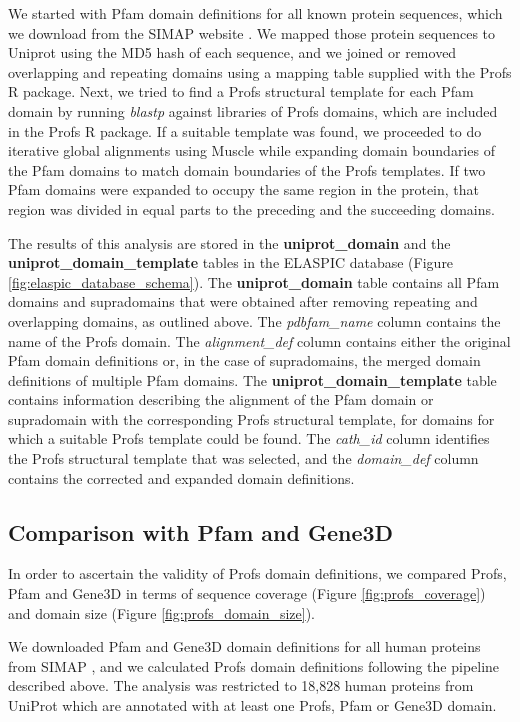 We started with Pfam domain definitions for all known protein sequences, which we download from the SIMAP website \cite{rattei_simapcomprehensive_2010}. We mapped those protein sequences to Uniprot using the MD5 hash of each sequence, and we joined or removed overlapping and repeating domains using a mapping table supplied with the Profs R package. Next, we tried to find a Profs structural template for each Pfam domain by running \textit{blastp} against libraries of Profs domains, which are included in the Profs R package. If a suitable template was found, we proceeded to do iterative global alignments using Muscle \cite{edgar_muscle:_2004} while expanding domain boundaries of the Pfam domains to match domain boundaries of the Profs templates. If two Pfam domains were expanded to occupy the same region in the protein, that region was divided in equal parts to the preceding and the succeeding domains.

The results of this analysis are stored in the \textbf{uniprot\_domain} and the \textbf{uniprot\_domain\_template} tables in the ELASPIC database (Figure \ref{fig:elaspic_database_schema}). The \textbf{uniprot\_domain} table contains all Pfam domains and supradomains that were obtained after removing repeating and overlapping domains, as outlined above. The \textit{pdbfam\_name} column contains the name of the Profs domain. The \textit{alignment\_def} column contains either the original Pfam domain definitions or, in the case of supradomains, the merged domain definitions of multiple Pfam domains. The \textbf{uniprot\_domain\_template} table contains information describing the alignment of the Pfam domain or supradomain with the corresponding Profs structural template, for domains for which a suitable Profs template could be found. The \textit{cath\_id} column identifies the Profs structural template that was selected, and the \textit{domain\_def} column contains the corrected and expanded domain definitions.


\subsection{Comparison with Pfam and Gene3D}

In order to ascertain the validity of Profs domain definitions, we compared Profs, Pfam and Gene3D in terms of sequence coverage (Figure \ref{fig:profs_coverage}) and domain size (Figure \ref{fig:profs_domain_size}).

We downloaded Pfam and Gene3D domain definitions for all human proteins from SIMAP \cite{rattei_simapcomprehensive_2010}, and we calculated Profs domain definitions following the pipeline described above. The analysis was restricted to 18,828 human proteins from UniProt which are annotated with at least one Profs, Pfam or Gene3D domain.


